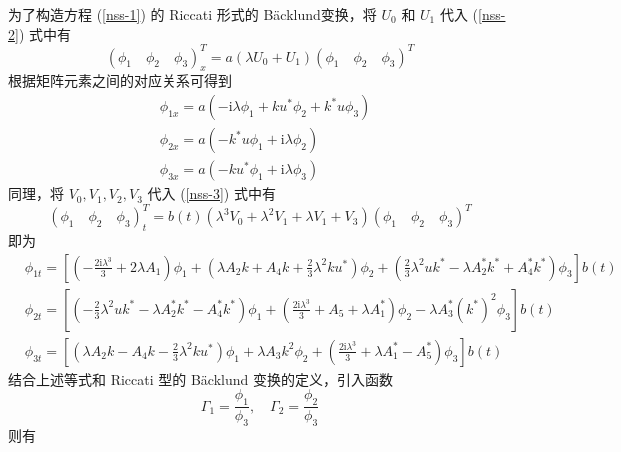 为了构造方程 (\ref{nss-1}) 的 Riccati 形式的 B\"acklund变换，将 $U_{0}$ 和 $U_{1}$ 代入 (\ref{nss-2}) 式中有
\begin{equation}
  (\phi_{1}\quad \phi_{2}\quad \phi_{3})_{x}^{T} = a(\lambda U_{0} + U_{1})(\phi_{1}\quad \phi_{2}\quad \phi_{3})^{T}
\end{equation}
根据矩阵元素之间的对应关系可得到
\begin{align}
  & \phi_{1x} = a(-\mathrm{i}\lambda\phi_{1} + ku^{*}\phi_{2} +k^{*}u\phi_{3}) \\
  & \phi_{2x} = a(-k^{*}u\phi_{1} + \mathrm{i}\lambda\phi_{2}) \\
  & \phi_{3x} = a(-ku^{*}\phi_{1} + \mathrm{i}\lambda\phi_{3})
\end{align}
同理，将 $V_{0}, V_{1}, V_{2}, V_{3}$ 代入 (\ref{nss-3}) 式中有
\begin{equation}
  (\phi_{1}\quad \phi_{2} \quad \phi_{3})^{T}_{t} = b(t)(\lambda^{3}V_{0} + \lambda^{2}V_{1} + \lambda V_{1} + V_{3})(\phi_{1}\quad \phi_{2} \quad \phi_{3})^{T}
\end{equation}
即为
\begin{align}
  & \phi_{1t} = \left[\left(-\frac{2\mathrm{i}\lambda^{3}}{3}+2\lambda A_{1}\right)\phi_{1} + \left(\lambda A_{2}k+A_{4}k+\frac{2}{3}\lambda^{2}ku^{*}\right)\phi_{2} + \left(\frac{2}{3}\lambda^{2}uk^{*}-\lambda A_{2}^{*}k^{*}+A_{4}^{*}k^{*}\right)\phi_{3}\right]b(t) \\
  & \phi_{2t} = \left[\left(-\frac{2}{3}\lambda^{2}uk^{*}-\lambda A_{2}^{*}k^{*}-A_{4}^{*}k^{*}\right)\phi_{1} + \left(\frac{2\mathrm{i}\lambda^{3}}{3}+A_{5}+\lambda A_{1}^{*}\right)\phi_{2} - \lambda A_{3}^{*}(k^{*})^{2}\phi_{3}\right]b(t) \\
  & \phi_{3t} = \left[\left(\lambda A_{2}k-A_{4}k-\frac{2}{3}\lambda^{2}ku^{*}\right)\phi_{1} + \lambda A_{3}k^{2}\phi_{2} + \left(\frac{2\mathrm{i}\lambda^{3}}{3}+\lambda A_{1}^{*} - A_{5}^{*}\right)\phi_{3}\right]b(t)
\end{align}
结合上述等式和 Riccati 型的 B\"acklund 变换的定义，引入函数
\begin{equation}
  \Gamma_{1} = \frac{\phi_{1}}{\phi_{3}}, \quad \Gamma_{2} = \frac{\phi_{2}}{\phi_{3}}
\end{equation}
则有
